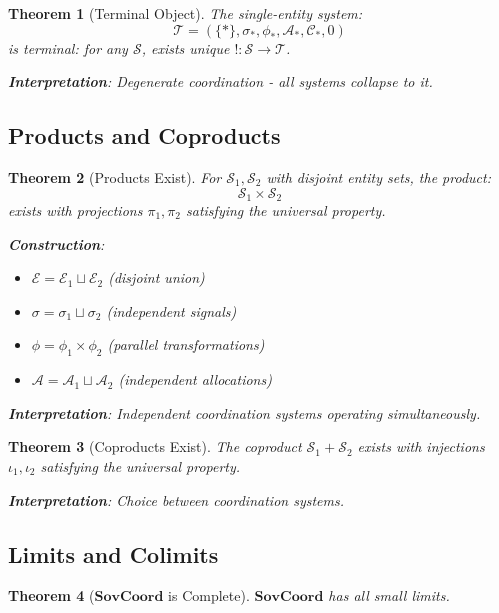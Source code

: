 \documentclass[11pt,a4paper]{article}
\newtheorem{theorem}{Theorem}[section]
\theoremstyle{definition}
\theoremstyle{remark}
\newcommand{\E}{\mathcal{E}}
\newcommand{\A}{\mathcal{A}}
\newcommand{\C}{\mathcal{C}}
\newcommand{\SovCoord}{\mathbf{SovCoord}}
\begin{document}
\begin{theorem}[Terminal Object]
The single-entity system:
\[ \mathcal{T} = (\{*\}, \sigma_*, \phi_*, \A_*, \C_*, 0) \]
is terminal: for any $\mathcal{S}$, exists unique $! : \mathcal{S} \to \mathcal{T}$.

\textbf{Interpretation}: Degenerate coordination - all systems collapse to it.
\end{theorem}

\subsection{Products and Coproducts}

\begin{theorem}[Products Exist]
For $\mathcal{S}_1, \mathcal{S}_2$ with disjoint entity sets, the product:
\[ \mathcal{S}_1 \times \mathcal{S}_2 \]
exists with projections $\pi_1, \pi_2$ satisfying the universal property.

\textbf{Construction}:
\begin{itemize}
\item $\E = \E_1 \sqcup \E_2$ (disjoint union)
\item $\sigma = \sigma_1 \sqcup \sigma_2$ (independent signals)
\item $\phi = \phi_1 \times \phi_2$ (parallel transformations)
\item $\A = \A_1 \sqcup \A_2$ (independent allocations)
\end{itemize}

\textbf{Interpretation}: Independent coordination systems operating simultaneously.
\end{theorem}

\begin{theorem}[Coproducts Exist]
The coproduct $\mathcal{S}_1 + \mathcal{S}_2$ exists with injections $\iota_1, \iota_2$ satisfying the universal property.

\textbf{Interpretation}: Choice between coordination systems.
\end{theorem}

\subsection{Limits and Colimits}

\begin{theorem}[$\SovCoord$ is Complete]
\label{thm:complete}
$\SovCoord$ has all small limits.
\end{theorem}
\end{document}
